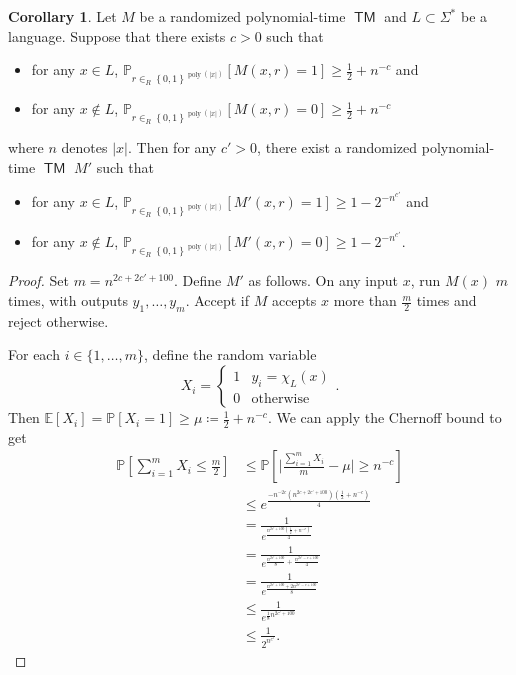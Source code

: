 \documentclass[10pt,letterpaper,cm]{nupset}
\theoremstyle{definition}
\theoremstyle{theorem}
\newtheorem{corollary}[definition]{Corollary}
\theoremstyle{remark}
\newcommand{\1}{\mathbf{1}}
\newcommand{\0}{\vec 0}
\DeclareMathOperator{\TM}{\mathsf{TM}}
\DeclareMathOperator{\poly}{poly}
\begin{document}
\begin{corollary}
Let $M$ be a randomized polynomial-time $\TM$ and $L\subset \Sigma^{\ast}$ be a language. Suppose that there exists $c>0$ such that
\begin{itemize}
\item for any $x\in L$, $\mathbb{P}_{r\in_R \left\{0,1\right\}^{\poly(\lvert{x}\rvert)}}[M(x,r)=1] \geq \frac{1}{2} +n^{-c}$ and
\item for any $x\notin L$, $\mathbb{P}_{r\in_R \left\{0,1\right\}^{\poly(\lvert{x}\rvert)}}[M(x,r)=0] \geq \frac{1}{2} + n^{-c}$
\end{itemize} where $n$ denotes $\lvert{x}\rvert$.
Then for any $c' >0$, there exist a randomized polynomial-time $\TM$ $M'$ such that 
\begin{itemize}
\item for any $x\in L$, $\mathbb{P}_{r\in_R \left\{0,1\right\}^{\poly(\lvert{x}\rvert)}}[M'(x,r)=1] \geq 1 - 2^{{-}n^{c'}}$ and
\item for any $x\notin L$, $\mathbb{P}_{r\in_R \left\{0,1\right\}^{\poly(\lvert{x}\rvert)}}[M'(x,r)=0] \geq 1 - 2^{{-}n^{c'}}$.
\end{itemize}
\end{corollary}
\begin{proof}
Set $m = n^{2c + 2c' + 100}$. Define $M'$ as follows. On any input $x$, run $M(x)$ $m$ times, with outputs $y_1, \ldots, y_m$. Accept if $M$ accepts $x$ more than $\frac{m}{2}$ times and reject otherwise.

\medskip

  For each $i\in \{1, \ldots, m\}$, define the random variable $$ X_i = \begin{cases} 1 & y_i = \chi_L(x) \\ 0 & \text{otherwise} \end{cases} .$$ Then $\mathbb{E}[X_i] = \mathbb{P}[X_i=1] \geq \mu\coloneqq \frac{1}{2} + n^{{-}c}$. We can apply the Chernoff bound to get   
\begin{align*}
 \mathbb{P}\left[\sum_{i=1}^m X_i \leq \frac{m}{2}\right] & \leq \mathbb{P}\left[ \lvert{\frac{\sum_{i=1}^m X_i}{m} -\mu}\rvert \geq n^{-c}\right] 
\\ & \leq
 e^{ \frac{ {-}n^{{-}2c}(n^{2c + 2c' + 100})(\frac{1}{2}+ n^{-c})}{4}
 }
 \\ & = \frac{1}{e^{\frac{ n^{2c' +100}(\frac{1}{2} + n^{{-}c} )                 }{  4   }}  }
 \\ & = \frac{1}{e^{ \frac{n^{2c' +100}}{8} +\frac{n^{2c' -c+100}}{4}          }}
 \\ & =  \frac{1}{e^{ \frac{n^{2c' +100} + 2 n^{2c' -c+100}}{8}       }}
 \\ &
 \leq \frac{1}{e^{\frac{1}{8}n^{2c' +100}}   }
 \\ & \leq \frac{1}{2^{n^{c'}}} . 
\end{align*} 
\end{proof}
\end{document}

